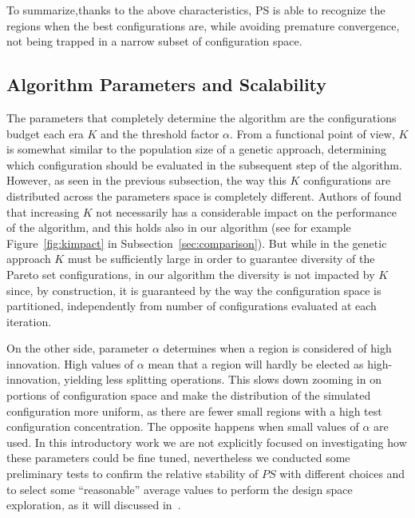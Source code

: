 To summarize,thanks to the above characteristics, PS is able to recognize the regions when the best configurations are, while avoiding premature convergence, not being trapped in a narrow subset of configuration space.

%

\subsection{Algorithm Parameters and Scalability} The parameters that
completely determine the algorithm are the configurations budget each
era $K$ and the threshold factor $\alpha$. From a functional point of
view, $K$ is somewhat similar to the population size of a genetic
approach, determining which configuration should be evaluated in the
subsequent step of the algorithm. However, as seen in the
previous subsection, the way this $K$ configurations are distributed
across the parameters space is completely different.
Authors of \cite{zitzler_ec00} found that
increasing $K$ not necessarily has a considerable impact on the
performance of the algorithm, and this holds also in our algorithm (see for example
Figure~\ref{fig:kimpact} in Subsection~\ref{sec:comparison}).
But while in the genetic approach $K$ must be sufficiently large
in order to guarantee diversity of the Pareto set configurations, in
our algorithm the diversity is not impacted by $K$ since, by
construction, it is guaranteed by the way the configuration space is
partitioned, independently from number of configurations evaluated at
each iteration. 

On the other side, parameter $\alpha$ determines when a region is considered of high
innovation. High values of $\alpha$ mean that a region will hardly be
elected as high-innovation, yielding less splitting operations. This
slows down zooming in on portions of configuration space and make the
distribution of the simulated configuration more uniform, as there are
fewer small regions with a high test configuration concentration. The
opposite happens when small values of $\alpha$ are used. In this
introductory work we are not explicitly focused on investigating how
these parameters could be fine tuned, nevertheless
we conducted some preliminary tests to confirm the relative stability
of $PS$ with different choices and to select some ``reasonable'' average
values to perform the design space exploration, as it will discussed
in~.

